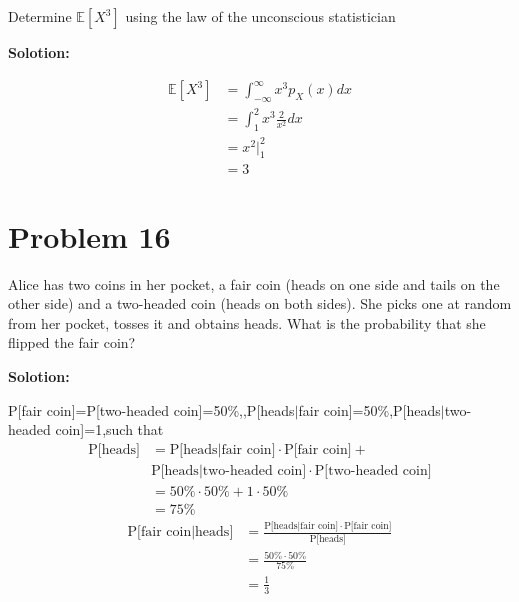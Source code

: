 \documentclass[a4paper,11pt,reqno]{amsart}
\begin{document}
\subsection{}
Determine $\mathbb{E}[X^3]$ using the law of the unconscious statistician

\textbf{Solotion:}

$$
\begin{aligned}
    \mathbb{E}[X^3]&=\int_{-\infty}^{\infty}x^3p_X(x) dx
    \\
    &=\int_{1}^{2}x^3\frac{2}{x^2} dx
    \\
    &=x^2\bigg|^2_1
    \\
    &=3
\end{aligned}
$$

\section{Problem 16}
Alice has two coins in her pocket, a fair coin (heads on one side and tails on the other side) and a
two-headed coin (heads on both sides). She picks one at random from her pocket, tosses it and obtains
heads. What is the probability that she flipped the fair coin?

\textbf{Solotion:}

P[fair coin]=P[two-headed coin]=50\%,,P[heads$|${fair coin}]=50\%,P[heads$|${two-headed coin}]=1,such that
$$
\begin{aligned}
    \text{P[heads}]&=\text{P[heads}|{\text{fair coin}}]\cdot \text{P[fair coin}]+
    \\
    &\text{P[heads}|{\text{two-headed coin}}]\cdot \text{P[two-headed coin}]
    \\
    &=50\%\cdot 50\%+1\cdot 50\%
    \\
    &=75\%
\end{aligned}
$$
\vspace{1em}
$$
\begin{aligned}
    \text{P[fair coin}| \text{heads}]&=\frac{\text{P[heads}| \text{fair coin}]\cdot\text{P[fair coin}]}{\text{P[heads}]}
    \\
    &=\frac{50\%\cdot 50\%}{75\%}
    \\
    &=\frac{1}{3}
\end{aligned}
$$

\end{document}
